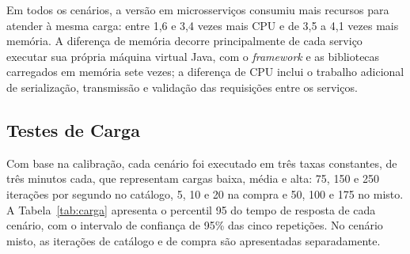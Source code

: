 Em todos os cenários, a versão em microsserviços consumiu mais recursos para atender à mesma
carga: entre 1,6 e 3,4 vezes mais CPU e de 3,5 a 4,1 vezes mais memória. A diferença de
memória decorre principalmente de cada serviço executar sua própria máquina virtual Java, com o
\textit{framework} e as bibliotecas carregados em memória sete vezes; a diferença de CPU inclui o
trabalho adicional de serialização, transmissão e validação das requisições entre os serviços.

\subsection{Testes de Carga}

Com base na calibração, cada cenário foi executado em três taxas constantes, de três minutos
cada, que representam cargas baixa, média e alta: 75, 150 e 250 iterações por segundo no
catálogo, 5, 10 e 20 na compra e 50, 100 e 175 no misto. A Tabela~\ref{tab:carga} apresenta o
percentil 95 do tempo de resposta de cada cenário, com o intervalo de confiança de 95\% das
cinco repetições. No cenário misto, as iterações de catálogo e de compra são apresentadas
separadamente.

